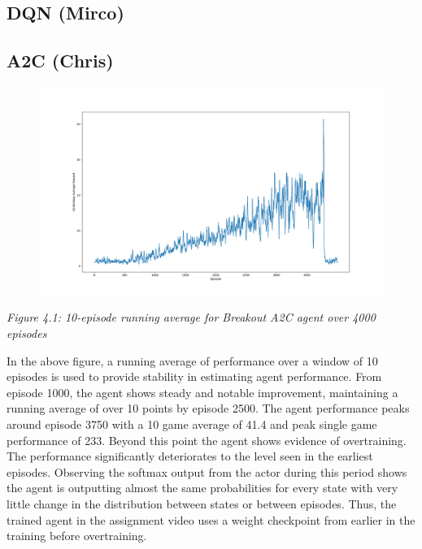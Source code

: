 \documentclass{article}
\begin{document}

\subsection{DQN (Mirco)}
\subsection{A2C (Chris)}

\begin{figure}[h]
\includegraphics[scale=0.2]{A2C4000.png}
\end{figure}
\emph{Figure 4.1: 10-episode running average for Breakout A2C agent over 4000 episodes}

In the above figure, a running average of performance over a window of 10 episodes is used to provide stability in estimating agent performance. From episode 1000, the agent shows steady and notable improvement, maintaining a running average of over 10 points by episode 2500. The agent performance peaks around episode 3750 with a 10 game average of 41.4 and peak single game performance of 233. Beyond this point the agent shows evidence of overtraining. The performance significantly deteriorates to the level seen in the earliest episodes. Observing the softmax output from the actor during this period shows the agent is outputting almost the same probabilities for every state with very little change in the distribution between states or between episodes. Thus, the trained agent in the assignment video uses a weight checkpoint from earlier in the training before overtraining.
\end{document}
